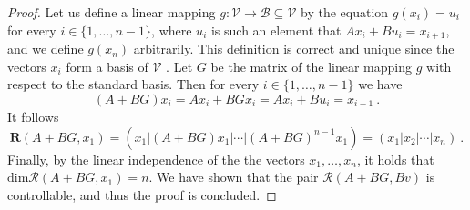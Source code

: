 \begin{proof}
    Let us define a linear mapping $g\colon\mathcal{V}\to\mathcal{B}\subseteq \mathcal{V}$ by the equation $g(x_i)=u_i$ for every $i\in\{1,\dots,n-1\}$, where $u_i$ is  such an element that $Ax_i+Bu_i=x_{i+1}$, and we define $g(x_n)$ arbitrarily. This definition is correct and unique since the vectors $x_i$ form a basis of $\mathcal{V}$ \citep[see][Tvrzení 6.4]{Barto}. Let $G$ be the matrix of the linear mapping $g$ with respect to the standard basis. Then for every $i\in\{1,\ldots,n-1\}$ we have
    $$(A+BG)x_i=Ax_i+BGx_i=Ax_i+Bu_i=x_{i+1}\ .$$
    It follows 
    $$\mathbf{R}(A+BG,x_1)=(x_1|(A+BG)x_1|\cdots|(A+BG)^{n-1}x_1)=(x_1|x_2|\cdots|x_n)\ .$$
    Finally, by the linear independence of the the vectors $x_1,\ldots,x_n$, it holds that $\text{dim}\mathcal{R}(A+BG,x_1)=n$. We have shown that the pair $\mathcal{R}(A+BG,Bv)$ is controllable, and thus the proof is concluded.
\end{proof}